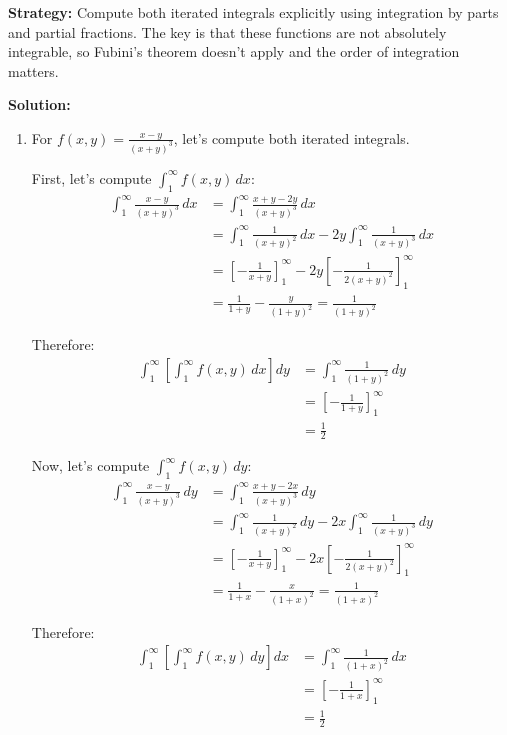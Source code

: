 \noindent\textbf{Strategy:} Compute both iterated integrals explicitly using integration by parts and partial fractions. The key is that these functions are not absolutely integrable, so Fubini's theorem doesn't apply and the order of integration matters.

\bigskip\noindent\textbf{Solution:}
\begin{enumerate}[label=(\alph*)]
\item For $f(x, y) = \frac{x - y}{(x + y)^3}$, let's compute both iterated integrals.

First, let's compute $\int_{1}^{\infty} f(x, y) \, dx$:
\begin{align*}
\int_{1}^{\infty} \frac{x - y}{(x + y)^3} \, dx &= \int_{1}^{\infty} \frac{x + y - 2y}{(x + y)^3} \, dx \\
&= \int_{1}^{\infty} \frac{1}{(x + y)^2} \, dx - 2y \int_{1}^{\infty} \frac{1}{(x + y)^3} \, dx \\
&= \left[-\frac{1}{x + y}\right]_{1}^{\infty} - 2y \left[-\frac{1}{2(x + y)^2}\right]_{1}^{\infty} \\
&= \frac{1}{1 + y} - \frac{y}{(1 + y)^2} = \frac{1}{(1 + y)^2}
\end{align*}

Therefore:
\begin{align*}
\int_{1}^{\infty} \left[ \int_{1}^{\infty} f(x, y) \, dx \right] dy &= \int_{1}^{\infty} \frac{1}{(1 + y)^2} \, dy \\
&= \left[-\frac{1}{1 + y}\right]_{1}^{\infty} \\
&= \frac{1}{2}
\end{align*}

Now, let's compute $\int_{1}^{\infty} f(x, y) \, dy$:
\begin{align*}
\int_{1}^{\infty} \frac{x - y}{(x + y)^3} \, dy &= \int_{1}^{\infty} \frac{x + y - 2x}{(x + y)^3} \, dy \\
&= \int_{1}^{\infty} \frac{1}{(x + y)^2} \, dy - 2x \int_{1}^{\infty} \frac{1}{(x + y)^3} \, dy \\
&= \left[-\frac{1}{x + y}\right]_{1}^{\infty} - 2x \left[-\frac{1}{2(x + y)^2}\right]_{1}^{\infty} \\
&= \frac{1}{1 + x} - \frac{x}{(1 + x)^2} = \frac{1}{(1 + x)^2}
\end{align*}

Therefore:
\begin{align*}
\int_{1}^{\infty} \left[ \int_{1}^{\infty} f(x, y) \, dy \right] dx &= \int_{1}^{\infty} \frac{1}{(1 + x)^2} \, dx \\
&= \left[-\frac{1}{1 + x}\right]_{1}^{\infty} \\
&= \frac{1}{2}
\end{align*}


\end{enumerate}
